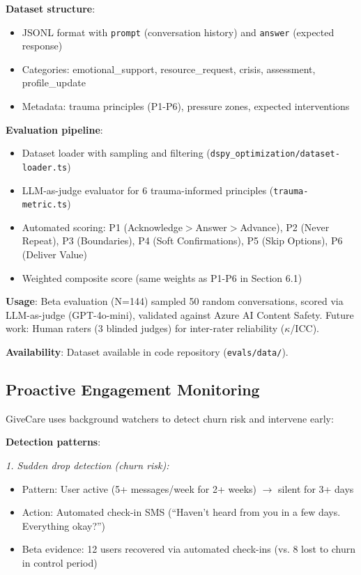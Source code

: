\documentclass{article}
\begin{document}
\textbf{Dataset structure}:
\begin{itemize}
    \item JSONL format with \texttt{prompt} (conversation history) and \texttt{answer} (expected response)
    \item Categories: emotional\_support, resource\_request, crisis, assessment, profile\_update
    \item Metadata: trauma principles (P1-P6), pressure zones, expected interventions
\end{itemize}

\textbf{Evaluation pipeline}:
\begin{itemize}
    \item Dataset loader with sampling and filtering (\texttt{dspy\_optimization/dataset-loader.ts})
    \item LLM-as-judge evaluator for 6 trauma-informed principles (\texttt{trauma-metric.ts})
    \item Automated scoring: P1 (Acknowledge$>$Answer$>$Advance), P2 (Never Repeat), P3 (Boundaries), P4 (Soft Confirmations), P5 (Skip Options), P6 (Deliver Value)
    \item Weighted composite score (same weights as P1-P6 in Section 6.1)
\end{itemize}

\textbf{Usage}: Beta evaluation (N=144) sampled 50 random conversations, scored via LLM-as-judge (GPT-4o-mini), validated against Azure AI Content Safety. Future work: Human raters (3 blinded judges) for inter-rater reliability ($\kappa$/ICC).

\textbf{Availability}: Dataset available in code repository (\texttt{evals/data/}).

%
\subsection{Proactive Engagement Monitoring}%
\label{subsec:ProactiveEngagementMonitoring}%
GiveCare uses background watchers to detect churn risk and intervene early:

\textbf{Detection patterns}:

\textit{1. Sudden drop detection (churn risk):}
\begin{itemize}
    \item Pattern: User active (5+ messages/week for 2+ weeks) $\rightarrow$ silent for 3+ days
    \item Action: Automated check-in SMS (``Haven't heard from you in a few days. Everything okay?'')
    \item Beta evidence: 12 users recovered via automated check-ins (vs. 8 lost to churn in control period)
\end{itemize}
\end{document}
